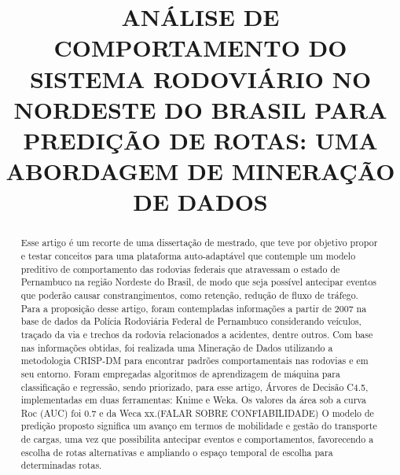 \documentclass[conference,compsoc]{IEEEtran}
\begin{document}
%

\title{ANÁLISE DE COMPORTAMENTO DO SISTEMA RODOVIÁRIO NO NORDESTE DO BRASIL PARA PREDIÇÃO DE ROTAS: UMA ABORDAGEM DE MINERAÇÃO DE DADOS}


\author{
\and
{}
}



\maketitle

\begin{abstract}
Esse artigo é um recorte de uma dissertação de mestrado, que
teve por objetivo propor e testar conceitos para uma plataforma auto-adaptável que contemple um modelo preditivo de comportamento das
rodovias federais que atravessam o estado de Pernambuco na região Nordeste do Brasil, de modo que seja possível antecipar eventos
que poderão causar constrangimentos, como retenção, redução de fluxo de tráfego. 
Para a proposição desse artigo, foram contempladas informações a partir de 2007 na base de dados da Polícia
Rodoviária Federal de Pernambuco considerando veículos, traçado da via e trechos da rodovia relacionados a acidentes, dentre outros.
Com base nas informações obtidas, foi realizada uma Mineração de Dados utilizando a
metodologia CRISP-DM para encontrar padrões comportamentais nas rodovias e em seu
entorno. Foram empregadas algoritmos de aprendizagem de máquina para classificação e regressão, sendo priorizado, para esse artigo, 
Árvores de Decisão C4.5, implementadas em duas ferramentas: Knime e Weka. Os valores da área sob a curva Roc (AUC) foi 0.7 e da Weca xx.(FALAR SOBRE CONFIABILIDADE)
O modelo de predição
proposto significa um avanço em termos de mobilidade e gestão do
transporte de cargas, uma vez que possibilita antecipar eventos e
comportamentos, favorecendo a escolha de rotas alternativas e
ampliando o espaço temporal de escolha para determinadas rotas.
\end{abstract}
\end{document}
